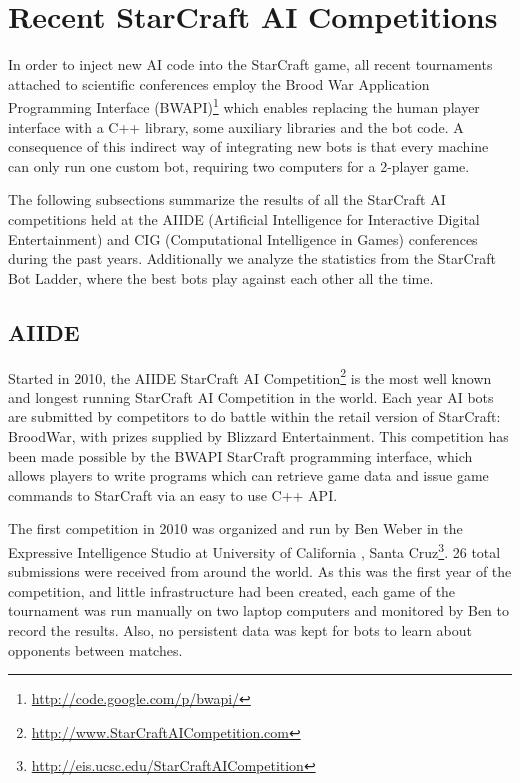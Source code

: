 \documentclass[journal]{IEEEtran}
\begin{document}

\section{Recent StarCraft AI Competitions}\label{sec:competition}

In order to inject new AI code into the StarCraft game, all recent
tournaments attached to scientific conferences employ the 
Brood War Application Programming Interface 
(BWAPI)\footnote{\url{http://code.google.com/p/bwapi/}} which 
enables replacing the human player interface with a C++ library,
some auxiliary libraries and the bot code. A consequence of this
indirect way of integrating new bots is that every machine can
only run one custom bot, requiring two computers for a 2-player game.

The following subsections summarize the results of all the StarCraft AI competitions held at the AIIDE (Artificial Intelligence for Interactive Digital Entertainment) and CIG (Computational Intelligence in Games) conferences during the past years. Additionally we analyze the statistics from the StarCraft Bot Ladder, where the best bots play against each other all the time. 

\subsection{AIIDE}\label{sec:AIIDE}

Started in 2010, the AIIDE StarCraft AI Competition\footnote{\url{http://www.StarCraftAICompetition.com}} is the most
well known and longest running StarCraft AI Competition in the world. Each year
AI bots are submitted by competitors to do battle within the retail version of
StarCraft: BroodWar, with prizes supplied by Blizzard Entertainment. This
competition has been made possible by the BWAPI StarCraft programming interface,
which allows players to write programs which can retrieve game data and issue
game commands to StarCraft via an easy to use C++ API.


The first competition in 2010 was organized and run by Ben Weber in the Expressive
Intelligence Studio at University of California , Santa Cruz\footnote{\url{http://eis.ucsc.edu/StarCraftAICompetition}}. 26 total submissions
were received from around the world. As this was the first year of the competition,
and little infrastructure had been created, each game of the tournament was run 
manually on two laptop computers and monitored by Ben to record the results. Also,
no persistent data was kept for bots to learn about opponents between matches.
\end{document}
